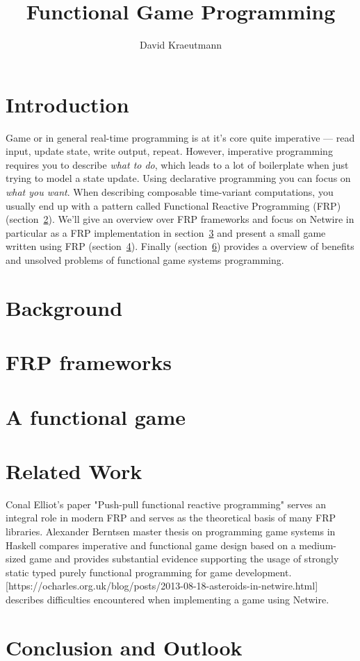 \documentclass{article}
\title{Functional Game Programming}
\author{David Kraeutmann}
\begin{document}
\maketitle

\section{Introduction}
Game or in general real-time programming is at it's core quite imperative --- read input, update state, write output, repeat.  However, imperative programming requires you to describe \emph{what to do}, which leads to a lot of boilerplate when just trying to model a state update. Using declarative programming you can focus on \emph{what you want}. When describing composable time-variant computations, you usually end up with a pattern called Functional Reactive Programming (FRP) (section~\ref{sec:background}). 
We'll give an overview over FRP frameworks and focus on Netwire in particular as a FRP implementation in section~\ref{sec:frameworks} and present a small game written using FRP (section~\ref{sec:game}). Finally (section~\ref{sec:conclusion}) provides a overview of benefits and unsolved problems of functional game systems programming.

\section{Background}
\label{sec:background}

\section{FRP frameworks}
\label{sec:frameworks}

\section{A functional game}
\label{sec:game}

\section{Related Work}
\label{sec:related}
Conal Elliot's paper "Push-pull functional reactive programming" serves an integral role in modern FRP
and serves as the theoretical basis of many FRP libraries. Alexander Berntsen master thesis on programming game systems in Haskell compares imperative and functional game design based on a medium-sized game and provides substantial evidence supporting the usage of strongly static typed purely functional programming for game development. [https://ocharles.org.uk/blog/posts/2013-08-18-asteroids-in-netwire.html] describes difficulties encountered when implementing a game using Netwire.
\section{Conclusion and Outlook}
\label{sec:conclusion}



\end{document}
